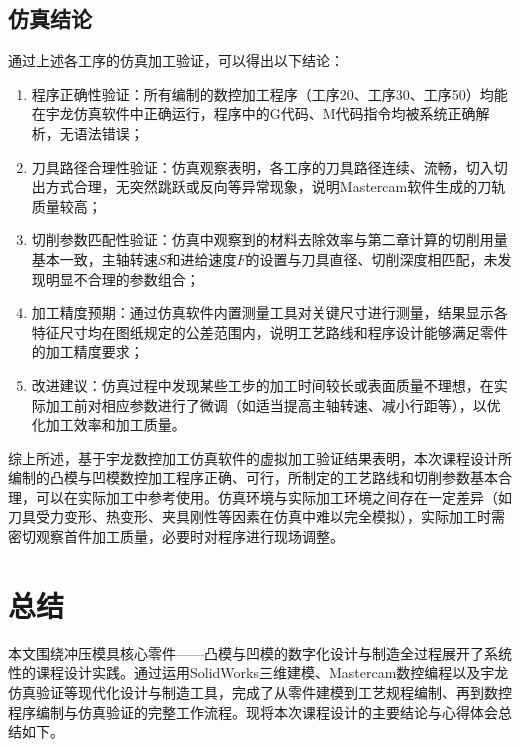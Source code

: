 \documentclass{xautCADreport}
\begin{document}
\subsection{仿真结论}

通过上述各工序的仿真加工验证，可以得出以下结论：

\begin{enumerate}
  \item 程序正确性验证：所有编制的数控加工程序（工序20、工序30、工序50）均能在宇龙仿真软件中正确运行，程序中的G代码、M代码指令均被系统正确解析，无语法错误；
  \item 刀具路径合理性验证：仿真观察表明，各工序的刀具路径连续、流畅，切入切出方式合理，无突然跳跃或反向等异常现象，说明Mastercam软件生成的刀轨质量较高；
  \item 切削参数匹配性验证：仿真中观察到的材料去除效率与第二章计算的切削用量基本一致，主轴转速$S$和进给速度$F$的设置与刀具直径、切削深度相匹配，未发现明显不合理的参数组合；
  \item 加工精度预期：通过仿真软件内置测量工具对关键尺寸进行测量，结果显示各特征尺寸均在图纸规定的公差范围内，说明工艺路线和程序设计能够满足零件的加工精度要求；
  \item 改进建议：仿真过程中发现某些工步的加工时间较长或表面质量不理想，在实际加工前对相应参数进行了微调（如适当提高主轴转速、减小行距等），以优化加工效率和加工质量。
\end{enumerate}

综上所述，基于宇龙数控加工仿真软件的虚拟加工验证结果表明，本次课程设计所编制的凸模与凹模数控加工程序正确、可行，所制定的工艺路线和切削参数基本合理，可以在实际加工中参考使用。仿真环境与实际加工环境之间存在一定差异（如刀具受力变形、热变形、夹具刚性等因素在仿真中难以完全模拟），实际加工时需密切观察首件加工质量，必要时对程序进行现场调整。




\newpage

\section{总结}

本文围绕冲压模具核心零件——凸模与凹模的数字化设计与制造全过程展开了系统性的课程设计实践。通过运用SolidWorks三维建模、Mastercam数控编程以及宇龙仿真验证等现代化设计与制造工具，完成了从零件建模到工艺规程编制、再到数控程序编制与仿真验证的完整工作流程。现将本次课程设计的主要结论与心得体会总结如下。
\end{document}
